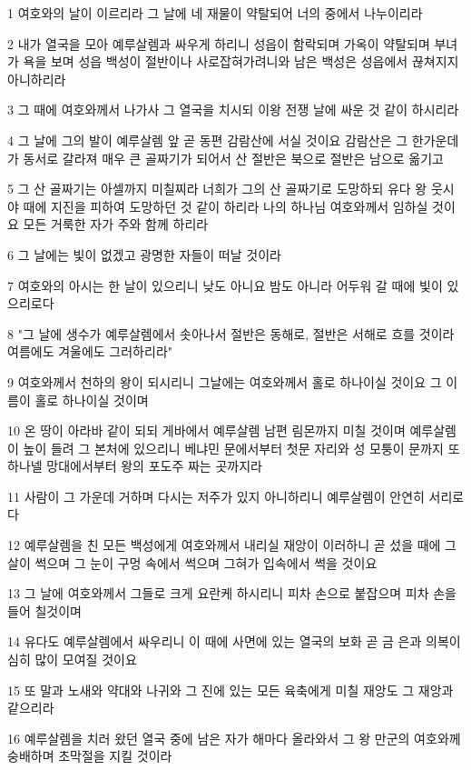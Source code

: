 \par 1 여호와의 날이 이르리라 그 날에 네 재물이 약탈되어 너의 중에서 나누이리라
\par 2 내가 열국을 모아 예루살렘과 싸우게 하리니 성읍이 함락되며 가옥이 약탈되며 부녀가 욕을 보며 성읍 백성이 절반이나 사로잡혀가려니와 남은 백성은 성읍에서 끊쳐지지 아니하리라
\par 3 그 때에 여호와께서 나가사 그 열국을 치시되 이왕 전쟁 날에 싸운 것 같이 하시리라
\par 4 그 날에 그의 발이 예루살렘 앞 곧 동편 감람산에 서실 것이요 감람산은 그 한가운데가 동서로 갈라져 매우 큰 골짜기가 되어서 산 절반은 북으로 절반은 남으로 옮기고
\par 5 그 산 골짜기는 아셀까지 미칠찌라 너희가 그의 산 골짜기로 도망하되 유다 왕 웃시야 때에 지진을 피하여 도망하던 것 같이 하리라 나의 하나님 여호와께서 임하실 것이요 모든 거룩한 자가 주와 함께 하리라
\par 6 그 날에는 빛이 없겠고 광명한 자들이 떠날 것이라
\par 7 여호와의 아시는 한 날이 있으리니 낮도 아니요 밤도 아니라 어두워 갈 때에 빛이 있으리로다
\par 8 "그 날에 생수가 예루살렘에서 솟아나서 절반은 동해로, 절반은 서해로 흐를 것이라 여름에도 겨울에도 그러하리라"
\par 9 여호와께서 천하의 왕이 되시리니 그날에는 여호와께서 홀로 하나이실 것이요 그 이름이 홀로 하나이실 것이며
\par 10 온 땅이 아라바 같이 되되 게바에서 예루살렘 남편 림몬까지 미칠 것이며 예루살렘이 높이 들려 그 본처에 있으리니 베냐민 문에서부터 첫문 자리와 성 모퉁이 문까지 또 하나넬 망대에서부터 왕의 포도주 짜는 곳까지라
\par 11 사람이 그 가운데 거하며 다시는 저주가 있지 아니하리니 예루살렘이 안연히 서리로다
\par 12 예루살렘을 친 모든 백성에게 여호와께서 내리실 재앙이 이러하니 곧 섰을 때에 그 살이 썩으며 그 눈이 구멍 속에서 썩으며 그혀가 입속에서 썩을 것이요
\par 13 그 날에 여호와께서 그들로 크게 요란케 하시리니 피차 손으로 붙잡으며 피차 손을 들어 칠것이며
\par 14 유다도 예루살렘에서 싸우리니 이 때에 사면에 있는 열국의 보화 곧 금 은과 의복이 심히 많이 모여질 것이요
\par 15 또 말과 노새와 약대와 나귀와 그 진에 있는 모든 육축에게 미칠 재앙도 그 재앙과 같으리라
\par 16 예루살렘을 치러 왔던 열국 중에 남은 자가 해마다 올라와서 그 왕 만군의 여호와께 숭배하며 초막절을 지킬 것이라
